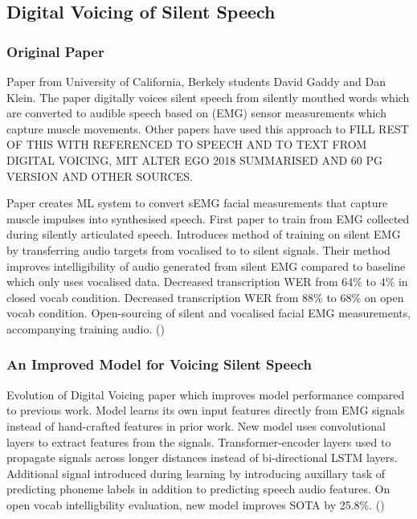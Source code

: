 \subsection{Digital Voicing of Silent Speech}

\subsubsection{Original Paper}

Paper from University of California, Berkely students David Gaddy and Dan Klein.
The paper digitally voices silent speech from silently mouthed words which are
converted to audible speech based on (EMG) sensor measurements which capture muscle movements.
Other papers have used this approach to FILL REST OF THIS WITH REFERENCED TO SPEECH AND TO TEXT
FROM DIGITAL VOICING, MIT ALTER EGO 2018 SUMMARISED AND 60 PG VERSION AND OTHER SOURCES.

Paper creates ML system to convert sEMG facial measurements that capture muscle impulses into synthesised speech.
First paper to train from EMG collected during silently articulated speech.
Introduces method of training on silent EMG by transferring audio targets from vocalised to to silent signals.
Their method improves intelligibility of audio generated from silent EMG compared to baseline which only uses vocalised data.
Decreased transcription WER from 64\% to 4\% in closed vocab condition.
Decreased transcription WER from 88\% to 68\% on open vocab condition.
Open-sourcing of silent and vocalised facial EMG measurements, accompanying training audio.
(\cite{gaddy2020digital})

\subsubsection{An Improved Model for Voicing Silent Speech}

Evolution of Digital Voicing paper which improves model performance compared to previous work.
Model learns its own input features directly from EMG signals instead of hand-crafted features in prior work.
New model uses convolutional layers to extract features from the signals.
Transformer-encoder layers used to propagate signals across longer distances instead of bi-directional LSTM layers.
Additional signal introduced during learning by introducing auxillary task of predicting phoneme labels in addition to predicting speech audio features.
On open vocab intelligbility evaluation, new model improves SOTA by 25.8\%.
(\cite{gaddy2021improved})


